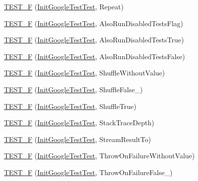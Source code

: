 \begin{DoxyCompactItemize}
\item 
\hyperlink{namespacetesting_a254368f412c980556143a9182f451981}{T\+E\+S\+T\+\_\+F} (\hyperlink{classtesting_1_1_init_google_test_test}{Init\+Google\+Test\+Test}, Repeat)
\item 
\hyperlink{namespacetesting_ab6624d856abda0913f536a4e719dd769}{T\+E\+S\+T\+\_\+F} (\hyperlink{classtesting_1_1_init_google_test_test}{Init\+Google\+Test\+Test}, Also\+Run\+Disabled\+Tests\+Flag)
\item 
\hyperlink{namespacetesting_a3e73dbd19fb50e5ad516de9592963033}{T\+E\+S\+T\+\_\+F} (\hyperlink{classtesting_1_1_init_google_test_test}{Init\+Google\+Test\+Test}, Also\+Run\+Disabled\+Tests\+True)
\item 
\hyperlink{namespacetesting_a1c50ef2a972315130f1613c69204e259}{T\+E\+S\+T\+\_\+F} (\hyperlink{classtesting_1_1_init_google_test_test}{Init\+Google\+Test\+Test}, Also\+Run\+Disabled\+Tests\+False)
\item 
\hyperlink{namespacetesting_a2f1fd86207e6c7085455dc2d582d1d12}{T\+E\+S\+T\+\_\+F} (\hyperlink{classtesting_1_1_init_google_test_test}{Init\+Google\+Test\+Test}, Shuffle\+Without\+Value)
\item 
\hyperlink{namespacetesting_a1acc3dcde65e75293451073528cb1c5a}{T\+E\+S\+T\+\_\+F} (\hyperlink{classtesting_1_1_init_google_test_test}{Init\+Google\+Test\+Test}, Shuffle\+False\+\_)
\item 
\hyperlink{namespacetesting_a24bb2b3783b9e0c419db7f974b641cd4}{T\+E\+S\+T\+\_\+F} (\hyperlink{classtesting_1_1_init_google_test_test}{Init\+Google\+Test\+Test}, Shuffle\+True)
\item 
\hyperlink{namespacetesting_af8579f8ad3383827814d1fbea4fdeee9}{T\+E\+S\+T\+\_\+F} (\hyperlink{classtesting_1_1_init_google_test_test}{Init\+Google\+Test\+Test}, Stack\+Trace\+Depth)
\item 
\hyperlink{namespacetesting_ad9cf0c452b4d2645b037725957021c6c}{T\+E\+S\+T\+\_\+F} (\hyperlink{classtesting_1_1_init_google_test_test}{Init\+Google\+Test\+Test}, Stream\+Result\+To)
\item 
\hyperlink{namespacetesting_a2824800277b4a1e8732abd5d7c2349d1}{T\+E\+S\+T\+\_\+F} (\hyperlink{classtesting_1_1_init_google_test_test}{Init\+Google\+Test\+Test}, Throw\+On\+Failure\+Without\+Value)
\item 
\hyperlink{namespacetesting_adfcdbd6b2715fddd03a47a822517ddea}{T\+E\+S\+T\+\_\+F} (\hyperlink{classtesting_1_1_init_google_test_test}{Init\+Google\+Test\+Test}, Throw\+On\+Failure\+False\+\_)
\item 

\end{DoxyCompactItemize}
